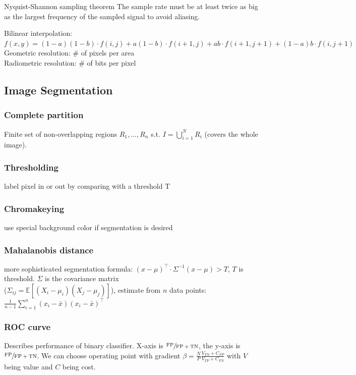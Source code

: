 \documentclass[a4paper,10pt]{article}
\begin{document}
\begin{mainbox}{Nyquist-Shannon sampling theorem}
    The sample rate must be at least twice as big as the largest frequency of the sampled signal to avoid aliasing.
\end{mainbox}

\noindent Bilinear interpolation: \(f(x,y) = (1-a)(1-b) \cdot f(i,j) + a(1-b) \cdot f(i+1,j) + ab \cdot f(i+1, j+1) + (1-a)b \cdot f(i,j+1)\) \\
Geometric resolution: \# of pixels per area \\
Radiometric resolution: \# of bits per pixel 

\subsection{Image Segmentation}
\subsubsection{Complete partition} 
Finite set of non-overlapping regions \( R_1, \dots, R_n \) s.t. \( I = \bigcup_{i=1}^N R_i \) (covers the whole image). 

\subsubsection{Thresholding} 
label pixel in or out by comparing with a threshold T

\subsubsection{Chromakeying}
use special background color if segmentation is desired 

\subsubsection{Mahalanobis distance} 
more sophisticated segmentation formula: \( (x - \mu)^\top \cdot \Sigma^{-1}(x - \mu) > T \), \( T \) is threshold. \( \Sigma  \) is the covariance matrix\\ (\( \Sigma_{ij} = \mathbb{E}\left[(X_i - \mu_i)(X_j - \mu_j) \right] \)), estimate from \( n \) data points: \( \frac{1}{n-1} \sum_{i=1}^{n} (x_i - \bar{x})(x_i - \bar{x})^\top \)

\subsubsection{ROC curve} 
Describes performance of binary classifier. X-axis is \( \sfrac{\text{FP}}{\text{FP}+\text{TN}} \), the y-axis is \( \sfrac{\text{FP}}{\text{FP} + \text{TN}} \). We can choose operating point with gradient \( \beta = \frac{N}{P} \frac{V_{TN} + C_{FP}}{V_{TP} + C_{FN}} \) with \( V \) being value and \( C \) being cost.
\end{document}
